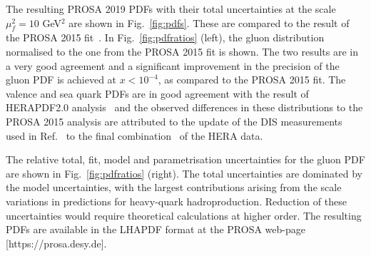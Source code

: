 \documentclass[12pt]{article}
\begin{document}
The resulting PROSA 2019 PDFs with their total uncertainties at the scale $\mu^2_f=10$ GeV$^2$ are shown in Fig.~\ref{fig:pdfs}. These are compared to the result of the PROSA 2015 fit~\cite{Zenaiev:2015rfa}. In Fig.~\ref{fig:pdfratios} (left), the gluon distribution 
normalised to the one from the PROSA 2015 fit is shown. The two results are in a very good agreement and a significant improvement 
in the precision of the gluon PDF is achieved at $x < 10^{-4}$, as compared to the PROSA 2015 fit. 
The valence and sea quark PDFs are in good agreement with the result of HERAPDF2.0 analysis~\cite{Abramowicz:2015mha} and the 
observed differences in these distributions to the PROSA 2015 analysis are attributed to the update of the DIS measurements~\cite{Aaron:2009aa} used in Ref.~\cite{Zenaiev:2015rfa} to the final combination~\cite{Abramowicz:2015mha} of the HERA data.

The relative total, fit, model and parametrisation uncertainties for the gluon PDF are shown in Fig.~\ref{fig:pdfratios} (right). 
The total uncertainties are dominated by the model uncertainties, with the largest contributions arising from the scale 
variations in predictions for heavy-quark hadroproduction. Reduction of these uncertainties would require theoretical calculations at higher order.  The resulting PDFs are available in the LHAPDF format at the PROSA web-page [https://prosa.desy.de].
\end{document}
